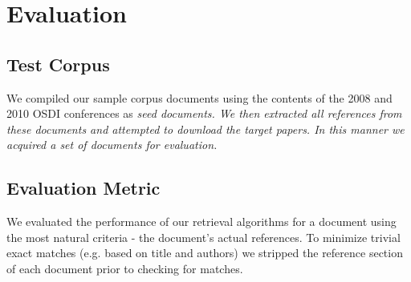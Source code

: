 \section{Evaluation}
\subsection{Test Corpus}
We compiled our sample corpus documents using the contents of 
the 2008 and 2010 OSDI conferences as \em{seed} documents.  We then extracted 
all references from these documents and attempted to download the target 
papers.  In this manner we acquired a set of \corpussize documents for 
evaluation.

\subsection{Evaluation Metric}

We evaluated the performance of our retrieval algorithms for a document using 
the most natural criteria - the document's actual references.  To minimize
trivial exact matches (e.g. based on title and authors) we stripped the 
reference section of each document prior to checking for matches.
